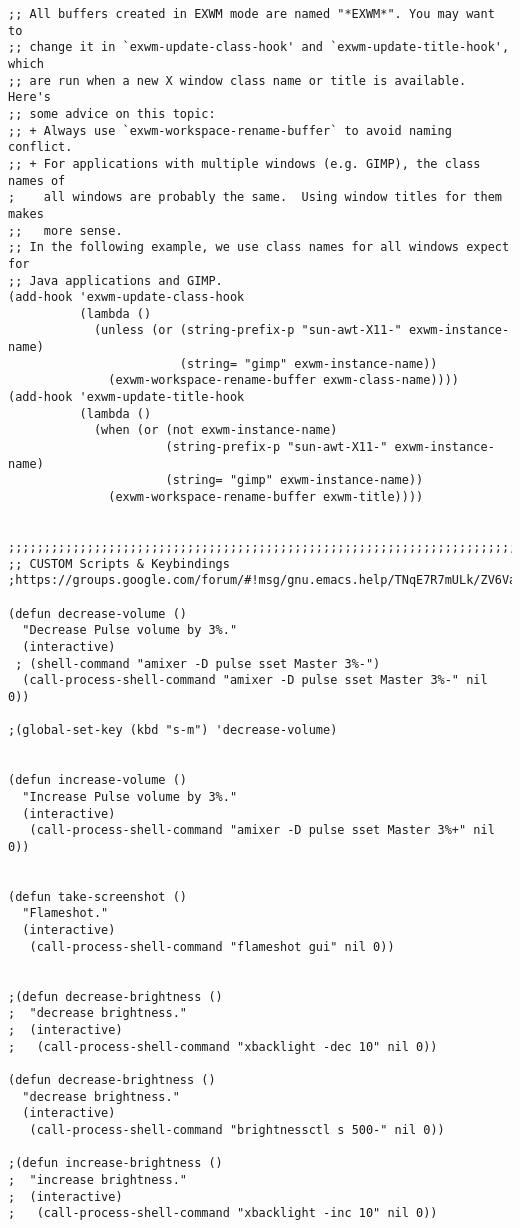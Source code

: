 \documentclass[11pt]{article}
\begin{document}
\begin{verbatim}
;; All buffers created in EXWM mode are named "*EXWM*". You may want to
;; change it in `exwm-update-class-hook' and `exwm-update-title-hook', which
;; are run when a new X window class name or title is available.  Here's
;; some advice on this topic:
;; + Always use `exwm-workspace-rename-buffer` to avoid naming conflict.
;; + For applications with multiple windows (e.g. GIMP), the class names of
;    all windows are probably the same.  Using window titles for them makes
;;   more sense.
;; In the following example, we use class names for all windows expect for
;; Java applications and GIMP.
(add-hook 'exwm-update-class-hook
          (lambda ()
            (unless (or (string-prefix-p "sun-awt-X11-" exwm-instance-name)
                        (string= "gimp" exwm-instance-name))
              (exwm-workspace-rename-buffer exwm-class-name))))
(add-hook 'exwm-update-title-hook
          (lambda ()
            (when (or (not exwm-instance-name)
                      (string-prefix-p "sun-awt-X11-" exwm-instance-name)
                      (string= "gimp" exwm-instance-name))
              (exwm-workspace-rename-buffer exwm-title))))


;;;;;;;;;;;;;;;;;;;;;;;;;;;;;;;;;;;;;;;;;;;;;;;;;;;;;;;;;;;;;;;;;;;;;;;;;;;;;;;;;;;;;;;;;;;;;;;;;;;;;;;;;;;;;;;;;;
;; CUSTOΜ Scripts & Keybindings
;https://groups.google.com/forum/#!msg/gnu.emacs.help/TNqE7R7mULk/ZV6VaeIiOHQJ

(defun decrease-volume ()
  "Decrease Pulse volume by 3%."
  (interactive)
 ; (shell-command "amixer -D pulse sset Master 3%-")
  (call-process-shell-command "amixer -D pulse sset Master 3%-" nil 0))

;(global-set-key (kbd "s-m") 'decrease-volume)


(defun increase-volume ()
  "Increase Pulse volume by 3%."
  (interactive)
   (call-process-shell-command "amixer -D pulse sset Master 3%+" nil 0))


(defun take-screenshot ()
  "Flameshot."
  (interactive)
   (call-process-shell-command "flameshot gui" nil 0))


;(defun decrease-brightness ()
;  "decrease brightness."
;  (interactive)
;   (call-process-shell-command "xbacklight -dec 10" nil 0))

(defun decrease-brightness ()
  "decrease brightness."
  (interactive)
   (call-process-shell-command "brightnessctl s 500-" nil 0))

;(defun increase-brightness ()
;  "increase brightness."
;  (interactive)
;   (call-process-shell-command "xbacklight -inc 10" nil 0))



\end{verbatim}
\end{document}
